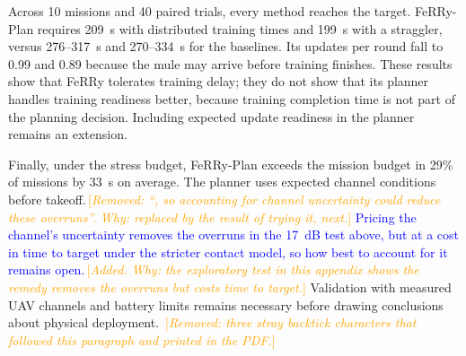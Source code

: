 \documentclass[conference]{IEEEtran}
\newcommand{\sysname}{FeRRy}
\newcommand{\changenote}[1]{\textcolor{orange}{\,[\emph{#1}]}}
\begin{document}
Across 10 missions and 40 paired trials, every method reaches the target.
\sysname{}-Plan requires 209~s with distributed training times and 199~s with
a straggler, versus 276--317~s and 270--334~s for the baselines. Its updates
per round fall to 0.99 and 0.89 because the mule may arrive before training
finishes. These results show that \sysname{} tolerates training delay; they do
not show that its planner handles training readiness better, because training
completion time is not part of the planning decision. Including expected update
readiness in the planner remains an extension.

Finally, under the stress budget, \sysname{}-Plan exceeds the mission budget in
29\% of missions by 33~s on average. The planner uses expected channel
conditions before takeoff.\changenote{Removed: ``, so accounting for channel uncertainty could reduce these overruns''. Why: replaced by the result of trying it, next.} \textcolor{blue}{Pricing the channel's uncertainty
removes the overruns in the 17~dB test above, but at a cost in time to target
under the stricter contact model, so how best to account for it remains open.}\changenote{Added. Why: the exploratory test in this appendix shows the remedy removes the overruns but costs time to target.}
Validation with measured UAV channels and battery limits remains
necessary before drawing conclusions about physical deployment.
\changenote{Removed: three stray backtick characters that followed this paragraph and printed in the PDF.}
\end{document}
